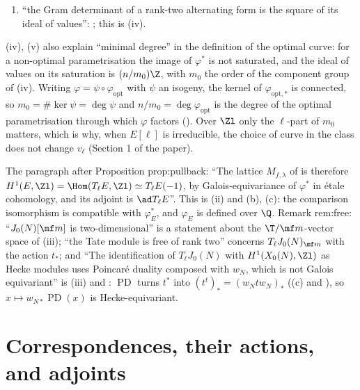 \begin{paperlink}
\begin{enumerate}[label=(\alph*)]
\item ``the Gram determinant of a rank-two alternating form is the square of its ideal of values'': ; this is (iv).
\end{enumerate}
(iv), (v) also explain ``minimal degree'' in the definition of the optimal curve: for a non-optimal parametrisation the image of $\varphi^*$ is not saturated, and the
ideal of values on its saturation is $(n/m_0)\Z$, with $m_0$ the order of the component group of (iv). Writing $\varphi=\psi\circ\varphi_{\mathrm{opt}}$ with $\psi$ an isogeny, the kernel of $\varphi_{\mathrm{opt},*}$
is connected, so $m_0=\#\ker\psi=\deg\psi$ and $n/m_0=\deg\varphi_{\mathrm{opt}}$ is the degree of the optimal parametrisation through which $\varphi$ factors (). Over $\Zl$ only the $\ell$-part of $m_0$ matters, which is why,
when $E[\ell]$ is irreducible, the choice of curve in the class does not change $v_\ell$ (Section 1 of the paper).
\end{paperlink}

\begin{paperlink}\label{pl:curves:free}
The paragraph after Proposition prop:pullback: ``The lattice $M_{f,\lambda}$ of \cite{DFG04} is therefore $H^1(E,\Zl)=\Hom(T_\ell E,\Zl)\simeq T_\ell E(-1)$, by Galois-equivariance of $\varphi^*$ in \'etale
cohomology, and its adjoint is $\ad T_\ell E$''. This is (ii) and (b), (c): the comparison isomorphism is compatible with
$\varphi_E^*$, and $\varphi_E$ is defined over $\Q$. Remark rem:free: ``$J_0(N)[\mf m]$ is two-dimensional'' is a statement about the $\T/\mf m$-vector space of
(iii); ``the Tate module is free of rank two'' concerns $T_\ell J_0(N)_{\mf m}$ with the action $t_*$; and ``The identification of $T_\ell J_0(N)$ with $H^1(X_0(N),\Zl)$ as Hecke
modules uses Poincar\'e duality composed with $w_N$, which is not Galois equivariant'' is (iii) and : $\operatorname{PD}$ turns $t^*$ into
$(t^t)_*=(w_Ntw_N)_*$ ((c) and ), so $x\mapsto w_{N*}\operatorname{PD}(x)$ is Hecke-equivariant.
\end{paperlink}

\section{Correspondences, their actions, and adjoints}\label{sec:curves:correspondences}

